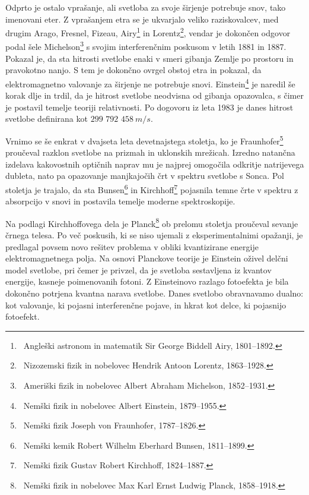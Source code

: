 Odprto je ostalo vprašanje, ali svetloba za svoje širjenje 
potrebuje snov, tako imenovani eter. Z vprašanjem etra se je 
ukvarjalo veliko raziskovalcev, med drugim Arago, Fresnel, Fizeau, 
Airy\footnote{~Angleški astronom in matematik Sir George Biddell Airy, 1801--1892.} 
in Lorentz\footnote{~Nizozemski fizik in nobelovec Hendrik Antoon Lorentz, 1863--1928.},
vendar je dokončen odgovor podal šele Michelson\footnote{~Ameriški fizik in nobelovec Albert
Abraham Michelson, 1852--1931.} s svojim 
interferenčnim poskusom v letih 1881 in 1887. Pokazal je, da
sta hitrosti svetlobe enaki v smeri gibanja Zemlje po prostoru in 
pravokotno nanjo. S tem je dokončno ovrgel obstoj etra in pokazal, 
da elektromagnetno valovanje za širjenje ne potrebuje snovi. 
Einstein\footnote{~Nemški fizik in nobelovec Albert Einstein, 1879--1955.} 
je naredil še korak dlje in trdil, da je hitrost 
svetlobe neodvisna od gibanja opazovalca, s čimer je postavil temelje 
teoriji relativnosti. Po dogovoru iz leta 1983 je danes 
hitrost svetlobe  definirana kot $299\,\,792\,\,458~\si{m/s}$. 

Vrnimo se še enkrat v dvajseta leta devetnajstega stoletja, ko je 
Fraunhofer\footnote{~Nemški fizik Joseph von Fraunhofer, 1787--1826.}
proučeval razklon svetlobe na prizmah in uklonskih mrežicah. Izredno
natančna izdelava kakovostnih optičnih naprav mu je najprej omogočila odkritje 
natrijevega dubleta, nato pa opazovanje manjkajočih črt v spektru
svetlobe s Sonca. Pol stoletja je trajalo, da
sta Bunsen\footnote{~Nemški kemik Robert Wilhelm Eberhard Bunsen, 1811--1899.}
in Kirchhoff\footnote{~Nemški fizik Gustav Robert Kirchhoff, 1824--1887.}
pojasnila temne črte v spektru z absorpcijo v snovi in postavila temelje
moderne spektroskopije.

Na podlagi Kirchhoffovega dela je Planck\footnote{~Nemški fizik in nobelovec
Max Karl Ernst Ludwig Planck, 1858--1918.} ob prelomu stoletja
proučeval sevanje črnega telesa. Po več poskusih, ki se niso
ujemali z eksperimentalnimi opažanji, je predlagal povsem novo rešitev problema
v obliki kvantizirane energije elektromagnetnega polja. Na osnovi
Planckove teorije je Einstein oživel delčni model svetlobe, pri čemer
je privzel, da je svetloba sestavljena iz kvantov energije, kasneje 
poimenovanih fotoni. Z Einsteinovo razlago fotoefekta je bila dokončno
potrjena kvantna narava svetlobe. Danes svetlobo obravnavamo
dualno: kot valovanje, ki pojasni interferenčne 
pojave, in hkrat kot delce, ki pojasnijo fotoefekt. 
